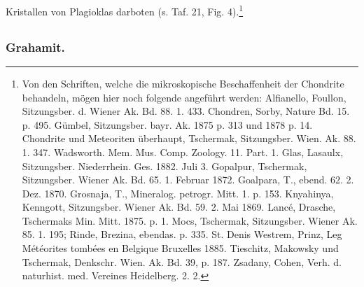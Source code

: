 \documentclass[a4paper, 12pt, oneside]{article}
\begin{document}
Kristallen von Plagioklas darboten (s. Taf. 21, Fig. 4).\footnote{Von den Schriften, welche die mikroskopische Beschaffenheit der Chondrite behandeln, mögen hier noch folgende angeführt werden: Alfianello, Foullon, Sitzungsber. d. Wiener Ak. Bd. 88. 1. 433. Chondren, Sorby, Nature Bd. 15. p. 495. Gümbel, Sitzungsber. bayr. Ak. 1875 p. 313 und 1878 p. 14. Chondrite und Meteoriten überhaupt, Tschermak, Sitzungsber. Wien. Ak. 88. 1. 347. Wadsworth. Mem. Mus. Comp. Zoology. 11. Part. 1. Glas, Lasaulx, Sitzungsber. Niederrhein. Ges. 1882. Juli 3. Gopalpur, Tschermak, Sitzungsber. Wiener Ak. Bd. 65. 1. Februar 1872. Goalpara, T., ebend. 62. 2. Dez. 1870. Grosnaja, T., Mineralog. petrogr. Mitt. 1. p. 153. Knyahinya, Kenngott, Sitzungsber. Wiener Ak. Bd. 59. 2. Mai 1869. Lancé, Drasche, Tschermaks Min. Mitt. 1875. p. 1. Mocs, Tschermak, Sitzungsber. Wiener Ak. 85. 1. 195; Rinde, Brezina, ebendas. p. 335. St. Denis Westrem, Prinz, Leg Météorites tombées en Belgique Bruxelles 1885. Tieschitz, Makowsky und Tschermak, Denkschr. Wien. Ak. Bd. 39, p. 187. Zsadany, Cohen, Verh. d. naturhist. med. Vereines Heidelberg. 2. 2.}
\clearpage
\subsection{}
\subsubsection{Grahamit.}
\end{document}
